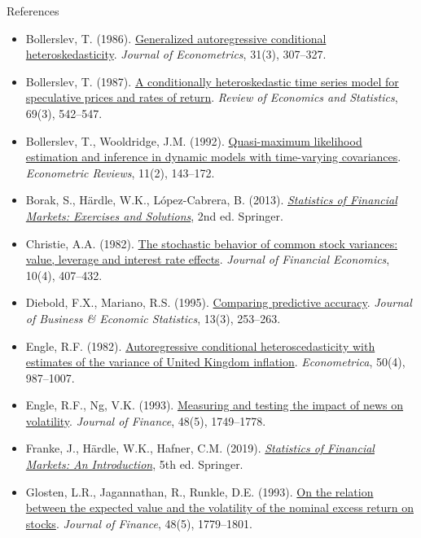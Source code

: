\begin{frame}{References}
\itemsize{\tiny}
\begin{itemize}
    \item Bollerslev, T. (1986). \href{https://doi.org/10.1016/0304-4076(86)90063-1}{Generalized autoregressive conditional heteroskedasticity}. \textit{Journal of Econometrics}, 31(3), 307--327.
    \item Bollerslev, T. (1987). \href{https://doi.org/10.2307/1925546}{A conditionally heteroskedastic time series model for speculative prices and rates of return}. \textit{Review of Economics and Statistics}, 69(3), 542--547.
    \item Bollerslev, T., Wooldridge, J.M. (1992). \href{https://doi.org/10.1080/07474939208800229}{Quasi-maximum likelihood estimation and inference in dynamic models with time-varying covariances}. \textit{Econometric Reviews}, 11(2), 143--172.
    \item Borak, S., Härdle, W.K., López-Cabrera, B. (2013). \href{https://doi.org/10.1007/978-3-642-33929-5}{\textit{Statistics of Financial Markets: Exercises and Solutions}}, 2nd ed. Springer.
    \item Christie, A.A. (1982). \href{https://doi.org/10.1016/0304-405X(82)90018-6}{The stochastic behavior of common stock variances: value, leverage and interest rate effects}. \textit{Journal of Financial Economics}, 10(4), 407--432.
    \item Diebold, F.X., Mariano, R.S. (1995). \href{https://doi.org/10.1080/07350015.1995.10524599}{Comparing predictive accuracy}. \textit{Journal of Business \& Economic Statistics}, 13(3), 253--263.
    \item Engle, R.F. (1982). \href{https://doi.org/10.2307/1912773}{Autoregressive conditional heteroscedasticity with estimates of the variance of United Kingdom inflation}. \textit{Econometrica}, 50(4), 987--1007.
    \item Engle, R.F., Ng, V.K. (1993). \href{https://doi.org/10.1111/j.1540-6261.1993.tb05127.x}{Measuring and testing the impact of news on volatility}. \textit{Journal of Finance}, 48(5), 1749--1778.
    \item Franke, J., Härdle, W.K., Hafner, C.M. (2019). \href{https://doi.org/10.1007/978-3-030-13751-9}{\textit{Statistics of Financial Markets: An Introduction}}, 5th ed. Springer.
    \item Glosten, L.R., Jagannathan, R., Runkle, D.E. (1993). \href{https://doi.org/10.1111/j.1540-6261.1993.tb05128.x}{On the relation between the expected value and the volatility of the nominal excess return on stocks}. \textit{Journal of Finance}, 48(5), 1779--1801.

\end{itemize}
\end{frame}
